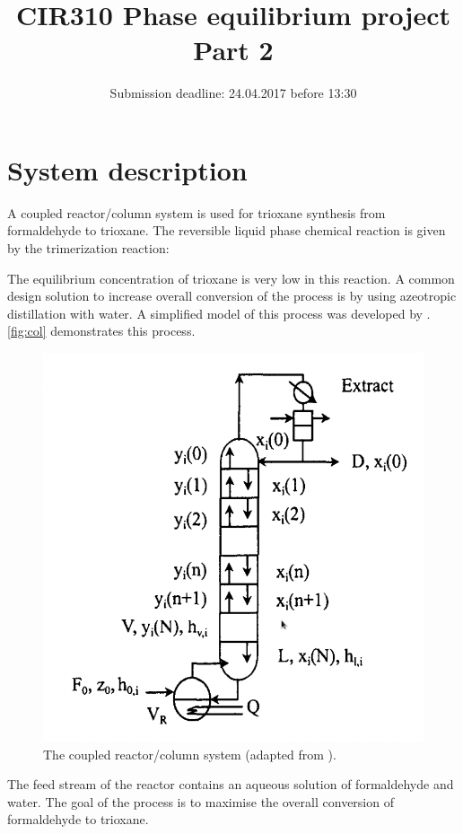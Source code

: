 \documentclass[12pt, A4paper]{article}
\title{CIR310 Phase equilibrium project\\Part 2}
\date{Submission deadline: 24.04.2017 before 13:30}
\begin{document}
\maketitle
\section{System description}
A coupled reactor/column system is used for trioxane synthesis from formaldehyde to trioxane.  The reversible liquid phase chemical reaction is given by the trimerization reaction:
 
{\centering
{} \par
}
The equilibrium concentration of trioxane is very low in this reaction. A common design solution to increase overall conversion of the process is by using azeotropic distillation with water. A simplified model of this process was developed by \citet{HU19991353}. \autoref{fig:col} demonstrates this process.

 \begin{figure} \centering
 \includegraphics[scale=0.45]{img/reaccol.png}
 \caption{ The coupled reactor/column system (adapted from \citet{HU19991353}).} \label{fig:col}
\end{figure}
 
The feed stream of the reactor contains an aqueous solution of formaldehyde and water.
The goal of the process is to maximise the overall conversion of formaldehyde to trioxane.
\end{document}
